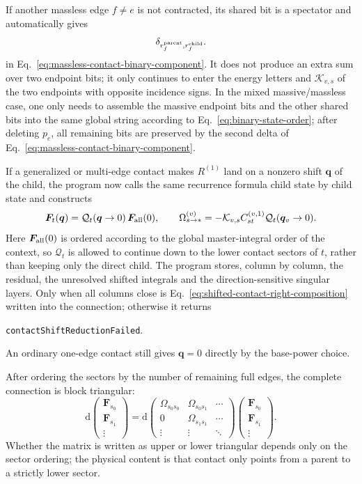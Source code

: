 \documentclass[11pt,a4paper]{article}
\newcommand{\dd}{\mathrm d}
\begin{document}
If another massless edge $f\neq e$ is not contracted, its shared bit is a spectator and automatically gives
\begin{equation}
 \delta_{r_f^{\rm parent},r_f^{\rm child}}.
 \label{eq:massless-spectator-delta}
\end{equation}
in Eq.~\eqref{eq:massless-contact-binary-component}. It does not produce an extra sum over two endpoint bits; it only continues to enter the energy letters and $\mathcal K_{v,s}$ of the two endpoints with opposite incidence signs. In the mixed massive/massless case, one only needs to assemble the massive endpoint bits and the other shared bits into the same global string according to Eq.~\eqref{eq:binary-state-order}; after deleting $p_e$, all remaining bits are preserved by the second delta of Eq.~\eqref{eq:massless-contact-binary-component}.

If a generalized or multi-edge contact makes $R^{(1)}$ land on a nonzero shift $\bm q$ of the child, the program now calls the same recurrence formula child state by child state and constructs
\begin{equation}
 \bm F_t(\bm q)=\mathcal Q_t(\bm q\to0)\,\bm F_{\rm all}(0),
 \qquad
 \Omega_{s\to *}^{(v)}
 =-\mathcal K_{v,s}C_{st}^{(v,1)}\mathcal Q_t(\bm q_v\to0).
 \label{eq:shifted-contact-right-composition}
\end{equation}
Here $\bm F_{\rm all}(0)$ is ordered according to the global master-integral order of the context, so $\mathcal Q_t$ is allowed to continue down to the lower contact sectors of $t$, rather than keeping only the direct child. The program stores, column by column, the residual, the unresolved shifted integrals and the direction-sensitive singular layers. Only when all columns close is Eq.~\eqref{eq:shifted-contact-right-composition} written into the connection; otherwise it returns
\begin{center}
 \texttt{contactShiftReductionFailed}.
\end{center}
An ordinary one-edge contact still gives $\bm q=0$ directly by the base-power choice.

After ordering the sectors by the number of remaining full edges, the complete connection is block triangular:
\begin{equation}
 \dd
 \begin{pmatrix}
 \bm F_{s_0}\\\bm F_{s_1}\\\vdots
 \end{pmatrix}
 =\dd
 \begin{pmatrix}
 \Omega_{s_0s_0}&\Omega_{s_0s_1}&\cdots\\
 0&\Omega_{s_1s_1}&\cdots\\
 \vdots&\vdots&\ddots
 \end{pmatrix}
 \begin{pmatrix}
 \bm F_{s_0}\\\bm F_{s_1}\\\vdots
 \end{pmatrix}.
 \label{eq:block-triangular-de}
\end{equation}
Whether the matrix is written as upper or lower triangular depends only on the sector ordering; the physical content is that contact only points from a parent to a strictly lower sector.
\end{document}
